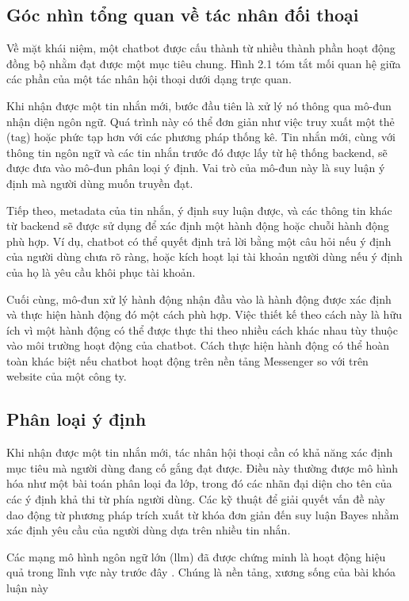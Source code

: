 \subsection{Góc nhìn tổng quan về tác nhân đối thoại}
\label{subsection:overview}

Về mặt khái niệm, một chatbot được cấu thành từ nhiều thành phần hoạt động đồng bộ nhằm đạt được một mục tiêu chung. Hình 2.1 tóm tắt mối quan hệ giữa các phần của một tác nhân hội thoại dưới dạng trực quan.

Khi nhận được một tin nhắn mới, bước đầu tiên là xử lý nó thông qua mô-đun nhận diện ngôn ngữ. Quá trình này có thể đơn giản như việc truy xuất một thẻ (tag) hoặc phức tạp hơn với các phương pháp thống kê. Tin nhắn mới, cùng với thông tin ngôn ngữ và các tin nhắn trước đó được lấy từ hệ thống backend, sẽ được đưa vào mô-đun phân loại ý định. Vai trò của mô-đun này là suy luận ý định mà người dùng muốn truyền đạt.

Tiếp theo, metadata của tin nhắn, ý định suy luận được, và các thông tin khác từ backend sẽ được sử dụng để xác định một hành động hoặc chuỗi hành động phù hợp. Ví dụ, chatbot có thể quyết định trả lời bằng một câu hỏi nếu ý định của người dùng chưa rõ ràng, hoặc kích hoạt lại tài khoản người dùng nếu ý định của họ là yêu cầu khôi phục tài khoản.

Cuối cùng, mô-đun xử lý hành động nhận đầu vào là hành động được xác định và thực hiện hành động đó một cách phù hợp. Việc thiết kế theo cách này là hữu ích vì một hành động có thể được thực thi theo nhiều cách khác nhau tùy thuộc vào môi trường hoạt động của chatbot. Cách thực hiện hành động có thể hoàn toàn khác biệt nếu chatbot hoạt động trên nền tảng Messenger so với trên website của một công ty.

\subsection{Phân loại ý định}
\label{subsection:intent_classification}

Khi nhận được một tin nhắn mới, tác nhân hội thoại cần có khả năng xác định mục tiêu mà người dùng đang cố gắng đạt được. Điều này thường được mô hình hóa như một bài toán phân loại đa lớp, trong đó các nhãn đại diện cho tên của các ý định khả thi từ phía người dùng. Các kỹ thuật để giải quyết vấn đề này dao động từ phương pháp trích xuất từ khóa đơn giản đến suy luận Bayes nhằm xác định yêu cầu của người dùng dựa trên nhiều tin nhắn.

Các mạng mô hình ngôn ngữ lớn (\gls{llm}) đã được chứng minh là hoạt động hiệu quả trong lĩnh vực này trước đây \cite{gao2023retrievalaugmented}. Chúng là nền tảng, xương sống của bài khóa luận này

